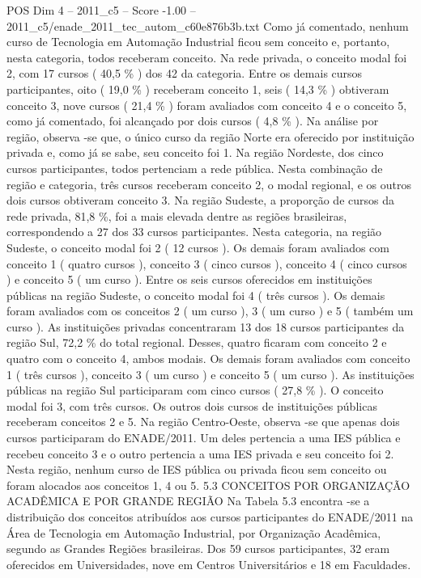 \begin{textsample}{POS Dim 4 – 2011\_c5 – Score -1.00 – 2011\_c5/enade\_2011\_tec\_autom\_c60e876b3b.txt}
Como já comentado, nenhum curso de Tecnologia em Automação Industrial ficou sem conceito e, portanto, nesta categoria, todos receberam conceito.
Na rede privada, o conceito modal foi 2, com 17 cursos ( 40,5 \% ) dos 42 da categoria.
Entre os demais cursos participantes, oito ( 19,0 \% ) receberam conceito 1, seis ( 14,3 \% ) obtiveram conceito 3, nove cursos ( 21,4 \% ) foram avaliados com conceito 4 e o conceito 5, como já comentado, foi alcançado por dois cursos ( 4,8 \% ).
Na análise por região, observa -se que, o único curso da região Norte era oferecido por instituição privada e, como já se sabe, seu conceito foi 1.
Na região Nordeste, dos cinco cursos participantes, todos pertenciam a rede pública.
Nesta combinação de região e categoria, três cursos receberam conceito 2, o modal regional, e os outros dois cursos obtiveram conceito 3.
Na região Sudeste, a proporção de cursos da rede privada, 81,8 \%, foi a mais elevada dentre as regiões brasileiras, correspondendo a 27 dos 33 cursos participantes.
Nesta categoria, na região Sudeste, o conceito modal foi 2 ( 12 cursos ).
Os demais foram avaliados com conceito 1 ( quatro cursos ), conceito 3 ( cinco cursos ), conceito 4 ( cinco cursos ) e conceito 5 ( um curso ).
Entre os seis cursos oferecidos em instituições públicas na região Sudeste, o conceito modal foi 4 ( três cursos ).
Os demais foram avaliados com os conceitos 2 ( um curso ), 3 ( um curso ) e 5 ( também um curso ).
As instituições privadas concentraram 13 dos 18 cursos participantes da região Sul, 72,2 \% do total regional.
Desses, quatro ficaram com conceito 2 e quatro com o conceito 4, ambos modais.
Os demais foram avaliados com conceito 1 ( três cursos ), conceito 3 ( um curso ) e conceito 5 ( um curso ).
As instituições públicas na região Sul participaram com cinco cursos ( 27,8 \% ).
O conceito modal foi 3, com três cursos.
Os outros dois cursos de instituições públicas receberam conceitos 2 e 5.
Na região Centro-Oeste, observa -se que apenas dois cursos participaram do ENADE/2011.
Um deles pertencia a uma IES pública e recebeu conceito 3 e o outro pertencia a uma IES privada e seu conceito foi 2.
Nesta região, nenhum curso de IES pública ou privada ficou sem conceito ou foram alocados aos conceitos 1, 4 ou 5. 5.3 CONCEITOS POR ORGANIZAÇÃO ACADÊMICA E POR GRANDE REGIÃO Na Tabela 5.3 encontra -se a distribuição dos conceitos atribuídos aos cursos participantes do ENADE/2011 na Área de Tecnologia em Automação Industrial, por Organização Acadêmica, segundo as Grandes Regiões brasileiras.
Dos 59 cursos participantes, 32 eram oferecidos em Universidades, nove em Centros Universitários e 18 em Faculdades.

\end{textsample}
